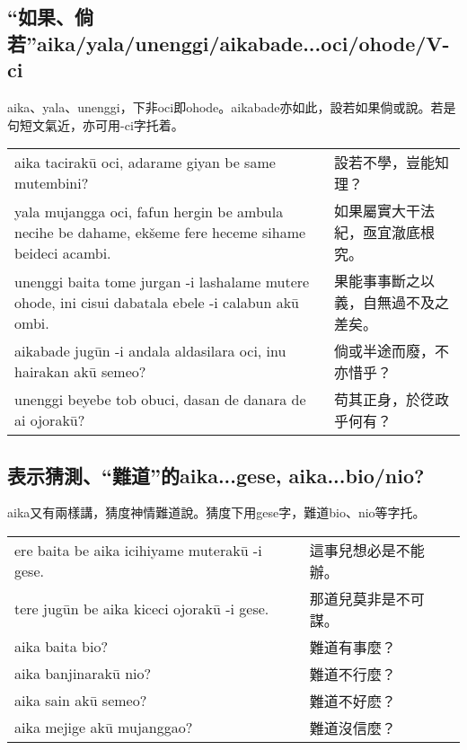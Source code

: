 \documentclass{article}
\begin{document}
\subsection{“如果、倘若”aika/yala/unenggi/aikabade...oci/ohode/V-ci}
\noindent aika、yala、unenggi，下非oci即ohode。aikabade亦如此，設若如果倘或說。若是句短文氣近，亦可用-ci字托着。
\begin{center}
    \begin{tabularx}{\textwidth}{XX}
        aika tacirak\={u} oci, adarame giyan be same mutembini? & 設若不學，豈能知理？\\
        yala mujangga oci, fafun hergin be ambula necihe be dahame, ek\v{s}eme fere heceme sihame beideci acambi. & 如果屬實大干法紀，亟宜澈底根究。\\
        unenggi baita tome jurgan -i lashalame mutere ohode, ini cisui dabatala ebele -i calabun ak\={u} ombi. & 果能事事斷之以義，自無過不及之差矣。\\
        aikabade jug\={u}n -i andala aldasilara oci, inu hairakan ak\={u} semeo? & 倘或半途而廢，不亦惜乎？\\
        unenggi beyebe tob obuci, dasan de danara de ai ojorak\={u}? &苟其正身，於徔政乎何有？
    \end{tabularx}
\end{center}

\subsection{表示猜測、“難道”的aika...gese, aika...bio/nio?}
\noindent aika又有兩樣講，猜度神情難道說。猜度下用gese字，難道bio、nio等字托。
\begin{center}
    \begin{tabularx}{\textwidth}{XX}
        ere baita be aika icihiyame muterak\={u} -i gese. & 這事兒想必是不能辦。\\
        tere jug\={u}n be aika kiceci ojorak\={u} -i gese. & 那道兒莫非是不可謀。\\
        aika baita bio? &難道有事麼？\\
        aika banjinarak\={u} nio? &難道不行麼？\\
        aika sain ak\={u} semeo? &難道不好麽？\\
        aika mejige ak\={u} mujanggao? & 難道沒信麼？
    \end{tabularx}
\end{center}
\end{document}
